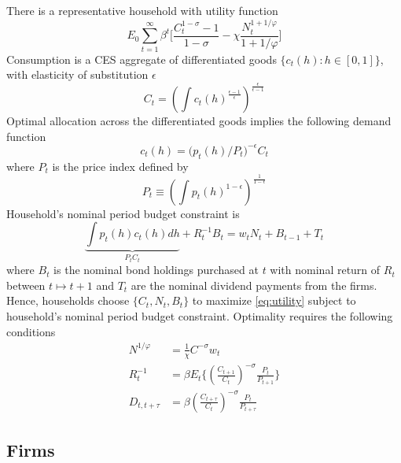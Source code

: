 \documentclass[a4paper,10pt]{article}  %
\begin{document}
There is a representative household with utility function
\begin{equation}
   \label{eq:utility}
   E_0 \sum_{t=1}^{\infty} \beta^t \bigg[ \frac{ C_t^{1-\sigma} -1}{ 1-\sigma } - \chi \frac{ N_t^{1+ 1/\varphi} }{ 1+ 1/\varphi } \bigg]   
\end{equation}
Consumption is a CES aggregate of differentiated goods $\{ c_t(h): h \in[ 0,1 ] \}$, with elasticity of substitution $ \epsilon $
\[
   C_t = \left( \int c_t(h)^{ \frac{\epsilon-1}{\epsilon} }  \right)^{\frac{\epsilon}{ \epsilon -1 }  }
\] 
Optimal allocation across the differentiated goods implies the following demand function
\begin{equation}
   \label{eq:demand_cons}
   c_t(h) = \big(p_t(h)/P_t \big)^{- \epsilon} C_t 
\end{equation}
where $ P_t $ is the price index defined by
\begin{equation}
   \label{eq:price_index}
   P_t \equiv \left( \int p_t(h)^{1-\epsilon} \right)^{ \frac{1}{1-\epsilon} } 
\end{equation}
Household's nominal period budget constraint is 
\[
   \underbrace{\int p_t(h) c_t(h)dh}_{P_t C_t} + R_t^{-1} B_t= w_t N_t + B_{t-1}+T_t
\]
where $ B_{t} $ is the nominal bond holdings purchased at $t$ with nominal return of $ R_t $ between $ t\mapsto t+1 $ and $ T_t $ are the
nominal dividend payments from the firms. Hence, households choose $ \big\{ C_t, N_t, B_t\big\} $ to maximize \eqref{eq:utility}
subject to household's nominal period budget constraint. Optimality requires the following conditions
\begin{align}
   N^{1/\varphi} & = \frac{1}{\chi} C^{-\sigma} w_t  \\
   R_{t}^{-1}    & = \beta E_t \Bigg\{ \left(\frac{C_{t+1}}{C_{t}}\right)^{-\sigma} \frac{P_t}{ P_{t+1} } \Bigg\} \\
   D_{t,t+\tau}  & =  \beta \left(\frac{C_{t+\tau}}{C_{t}}\right)^{-\sigma} \frac{P_t}{ P_{t+\tau} }
\end{align}


\subsection{Firms} %
\label{sub:firms}
\end{document}
